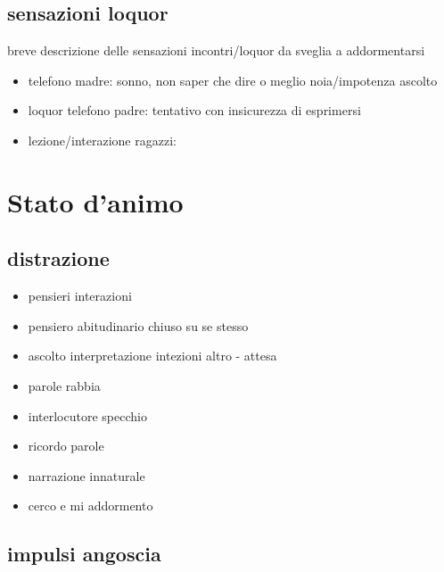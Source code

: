 \subsection{sensazioni loquor}

breve descrizione delle sensazioni incontri/loquor da sveglia a addormentarsi

\begin{itemize}

\item telefono madre: sonno, non saper che dire o meglio noia/impotenza ascolto

\item loquor telefono padre: tentativo con insicurezza di esprimersi

\item lezione/interazione ragazzi: 

\end{itemize}

\section{Stato d'animo}


\subsection{distrazione}

\begin{itemize}

\item pensieri  interazioni

\item pensiero abitudinario chiuso su se stesso

\item ascolto interpretazione intezioni altro - attesa

\item parole rabbia

\item interlocutore specchio

\item ricordo parole

\item narrazione  innaturale

\item cerco e mi addormento

\end{itemize}

\subsection{impulsi angoscia}

